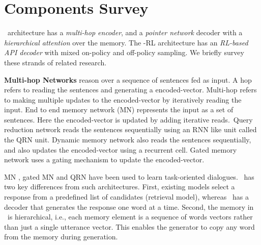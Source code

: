 
\section{Components Survey}

\sys\ architecture has a {\em multi-hop encoder}, and a {\em pointer network} decoder with a {\em hierarchical attention} over the memory. The \sys -RL architecture has an {\em RL-based API decoder} with mixed on-policy and off-policy sampling. We briefly survey these strands of related research.

\vspace{0.5ex}
\noindent
\textbf{Multi-hop Networks} reason over a sequence of sentences fed as input. A hop refers to reading the sentences and generating a encoded-vector. Multi-hop refers to making multiple updates to the encoded-vector by iteratively reading the input. End to end memory network (MN) \cite{sukhbaatar2015end} represents the input as a set of sentences. Here the encoded-vector is updated by adding iterative reads.~Query reduction network \cite{seo2016query} reads the sentences sequentially using an RNN like unit called the QRN unit. Dynamic memory network \cite{kumar2016ask} also reads the sentences sequentially, and also updates the encoded-vector using a recurrent cell. Gated memory network \cite{liu2017gated} uses a gating mechanism to update the encoded-vector. %

MN \cite{BordesW16}, gated MN and QRN have been used to learn task-oriented dialogues. \sys\ has two key differences from such architectures. First, existing models select a response from a predefined list of candidates (retrieval model), whereas \sys\ has a decoder that generates the response one word at a time. Second, the memory in \sys\ is hierarchical, i.e., each memory element is a sequence of words vectors rather than just a single utterance vector. This enables the generator to copy any word from the memory during generation.


